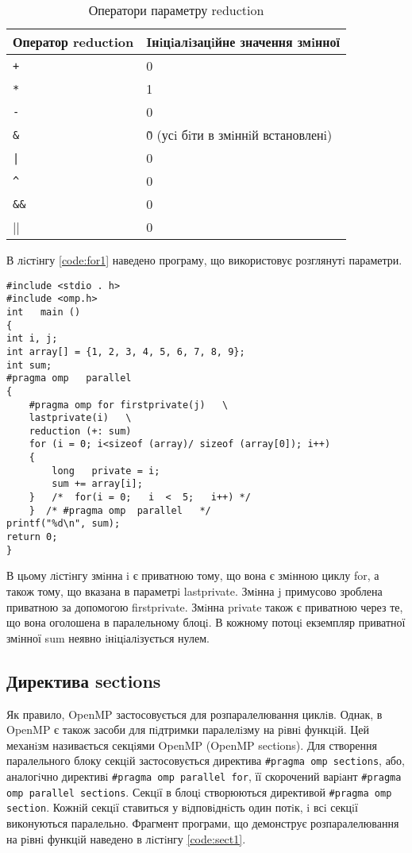 	
\begin{longtable}[t]{|l|p{20em}|}

\caption{Оператори параметру reduction} \label{tab:table1}\\
\hline

Оператор reduction & Iнiцiалiзацiйне значення змiнної \\
\hline


\verb|+| & 0 \\
\verb|*| & 1 \\
\verb|-| & 0 \\
\verb|&| & \~0 (усi бiти в змiннiй встановленi) \\
\verb'|' & 0 \\
\verb|^| & 0 \\
\verb|&&| & 0 \\
\verb|||| & 0 \\

\hline
\end{longtable}

В лiстiнгу \ref{code:for1} наведено програму, що використовує розглянутi параметри. 

\begin{lstlisting}[label=code:for1,caption=Параметри прагми for]
#include <stdio . h>
#include <omp.h> 
int   main () 
{
int i, j;
int array[] = {1, 2, 3, 4, 5, 6, 7, 8, 9};
int sum; 
#pragma omp   parallel
{ 
	#pragma omp for firstprivate(j)   \
	lastprivate(i)   \
	reduction (+: sum)
	for (i = 0; i<sizeof (array)/ sizeof (array[0]); i++)
	{
		long   private = i; 
		sum += array[i];
	}   /*	for(i = 0;   i  <  5;   i++) */
	}  /* #pragma omp  parallel   */
printf("%d\n", sum);
return 0; 
}
\end{lstlisting}
В цьому лiстiнгу змiнна i є приватною тому, що вона є змiнною циклу for, а також тому, що вказана в параметрi lastprivate. Змiнна j примусово зроблена приватною за допомогою firstprivate. Змiнна private також є приватною через те, що вона оголошена в паралельному блоцi. В кожному потоцi екземпляр приватної змiнної sum неявно iнiцiалiзується нулем.

\subsection*{Директива sections}
Як правило, OpenMP застосовується для розпаралелювання циклiв. Однак, в OpenMP є також засоби для пiдтримки паралелiзму на рiвнi функцiй. Цей механiзм називається секцiями OpenMP (OpenMP sections). Для створення паралельного блоку секцiй застосовується директива \verb'#pragma omp sections', або, аналогiчно директивi \verb'#pragma omp parallel for', її скорочений варiант \verb'#pragma omp parallel sections'. Секцiї в блоцi створюються директивой \verb'#pragma omp section'. Кожнiй секцiї ставиться у вiдповiднiсть один потiк, i всi секцiї виконуються паралельно. Фрагмент програми, що демонструє розпаралелювання на рiвнi функцiй наведено в лiстiнгу \ref{code:sect1}. 

